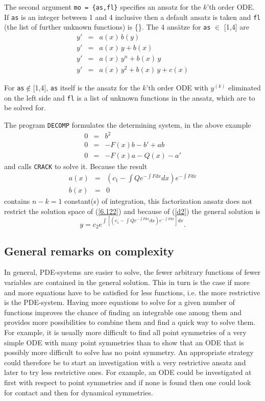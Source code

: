 The second argument {\tt mo = \{as,fl\}} specifies an ansatz for the $k$'th
order ODE. If {\tt as} is an integer between 1 and 4 inclusive
then a default ansatz
is taken and {\tt fl} (the list of further unknown functions) is \{\}.
The 4 ans\"atze for \verb+as+ $\in$ [1,4] are
\begin{eqnarray}
y' & = & a(x)\,b(y)      \nonumber   \\
y' & = & a(x)\,y + b(x)   \label{d2}     \\
y' & = & a(x)\,y^n + b(x)\,y    \nonumber   \\
y' & = & a(x)\,y^2 + b(x)\,y + c(x)      \nonumber
\end{eqnarray}

   For {\tt as}$\not\in$[1,4], {\tt as} itself is the ansatz for the $k$'th
order ODE with $y^{(k)}$ eliminated on the left side and {\tt fl} is
a list of unknown functions in the ansatz, which are to be solved for.

The program {\tt DECOMP} formulates the determining system, in the above
example
\begin{eqnarray*}
0 & = & b^2  \\
0 & = & - F(x)b - b' + ab  \\
0 & = & - F(x)a - Q(x) - a'
\end{eqnarray*}
and calls {\tt CRACK} to solve it. Because the result
\begin{eqnarray*}
a(x) & = & \left(c_1 - \int Qe^{-\int F dx} dx\right)e^{-\int F dx} \\
b(x) & = & 0
\end{eqnarray*}
contains $n-k = 1$ constant(s) of integration, this factorization ansatz
does not restrict the solution space  of (\ref{6.122})
and because of (\ref{d2}) the general solution is
\[y = c_2e^{\int \left[\left(c_1 - \int Qe^{-\int F dx} dx\right)e^{-\int F dx}
\right] dx}.\]

\subsection{General remarks on complexity}
In general, PDE-systems are easier to solve, the fewer arbitrary functions of
fewer variables are contained in the general solution. This in turn
is the case if more and more equations have to be satisfied for less functions,
i.e. the more restrictive is the PDE-system.
Having more equations to solve for a given number of functions
improves the
chance of finding an integrable one among them and provides
more possibilities to combine them and find a quick way to solve
them. For example, it is usually more difficult to find all
point symmetries of a very simple ODE with many point symmetries
than to show that an ODE that is possibly more difficult
to solve has no point symmetry.
An appropriate strategy could therefore be to start an
investigation with a very restrictive ansatz and later to try
less restrictive ones. For example, an ODE could be investigated at first
with respect to point symmetries and if none is found then one
could look for contact and then for dynamical symmetries.

